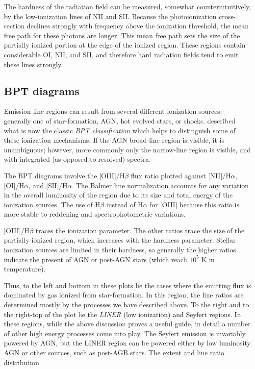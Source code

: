 The hardness of the radiation field can be measured, somewhat
counterintuitively, by the low-ionization lines of NII and
SII. Because the photoionization cross-section declines strongly with
frequency above the ionization threshold, the mean free path for these
photons are longer. This mean free path sets the size of the partially
ionized portion at the edge of the ionized region. These regions
contain considerable OI, NII, and SII, and therefore hard radiation
fields tend to emit these lines strongly.

\subsection{BPT diagrams}

Emission line regions can result from several different ionization
sources: generally one of star-formation, AGN, hot evolved stars, or
shocks. \citet{baldwin81a} described what is now the classic {\it BPT
classification} which helps to distinguish some of these ionization
mechanisms. If the AGN broad-line region is visible, it is
unambiguous; however, more commonly only the narrow-line region is
visible, and with integrated (as opposed to resolved) spectra.

The BPT diagrams involve the [OIII]/H$\beta$ flux ratio plotted
against [NII]/H$\alpha$, [OI]/H$\alpha$, and [SII]/H$\alpha$. The
Balmer line normalization accounts for any variation in the overall
luminosity of the region due to its size and total energy of the
ionization sources. The use of H$\beta$ instead of H$\alpha$ for
[OIII] because this ratio is more stable to reddening and
spectrophotometric variations.

[OIII]/H$\beta$ traces the ionization parameter. The other ratios
trace the size of the partially ionized region, which increases with
the hardness parameter. Stellar ionization sources are limited in
their hardness, so generally the higher ratios indicate the present of
AGN or post-AGN stars (which reach $10^5$ K in temperature).

Thus, to the left and bottom in these plots lie the cases where the
emitting flux is dominated by gas ionized from star-formation. In this
region, the line ratios are determined mostly by the processes we have
described above. To the right and to the right-top of the plot lie the
{\it LINER} (low ionization) and Seyfert regions. In these regions,
while the above discussion proves a useful guide, in detail a number
of other high energy processes come into play. The Seyfert emission is
invariably powered by AGN, but the LINER region can be powered either
by low luminosity AGN or other sources, such as post-AGB stars. The
extent and line ratio distribution

